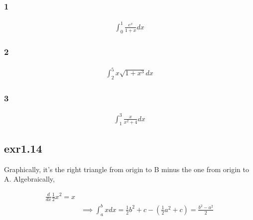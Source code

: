 \documentclass[letterpaper]{article}
\begin{document}
\subsubsection{1}
\label{sec:org26eb802}

\[\begin{aligned}
    \int_0^1 \frac{e^x}{1+x} dx
	\end{aligned}\]

\subsubsection{2}
\label{sec:org47e0615}

\[\begin{aligned}
    \int_2^5 x\sqrt{1+x^3}dx
	\end{aligned}\]

\subsubsection{3}
\label{sec:org2188c0f}

\[\begin{aligned}
    \int_1^3 \frac{x}{x^2+4}dx
	\end{aligned}\]

\subsection{exr1.14}
\label{sec:orgf6d23e5}
Graphically, it's the right triangle from origin to B minus the one from origin to A. Algebraically,

\[\begin{aligned}
   \frac{d}{dx}\frac{1}{2}x^2 = x\\
&\implies \int_a^b xdx = \frac{1}{2}b^2 + c - \left(\frac{1}{2} a^2 + c\right) = \frac{b^2-a^2}{2}
   \end{aligned}\]
\end{document}
